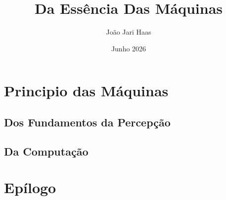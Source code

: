 \documentclass[11pt,a5paper]{article}
\title{Da Essência Das Máquinas}
\author{João Jari Haas}
\date{Junho 2026}
\begin{document}
\maketitle




\section{Principio das Máquinas}
\subsection{Dos Fundamentos da Percepção}
\subsection{Da Computação}
\section{Epílogo}
\end{document}

